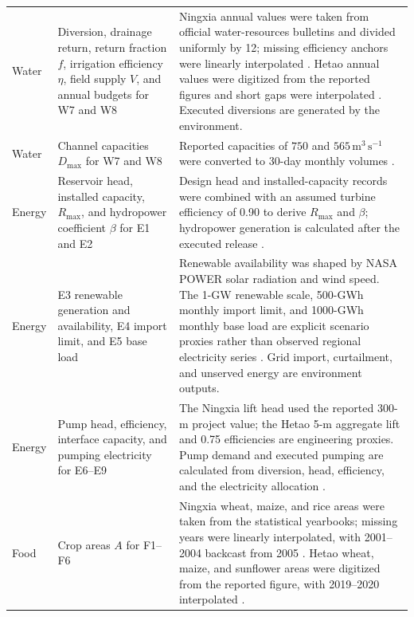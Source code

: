 \documentclass [a4paper,fleqn] {cas-dc}
\begin{document}
\begin{xltabular}{\textwidth}{@{}>{\raggedright\arraybackslash}p{0.09\textwidth}
  >{\raggedright\arraybackslash}p{0.24\textwidth}
  >{\raggedright\arraybackslash}X@{}}
Water & Diversion, drainage return, return fraction $f$, irrigation efficiency
$\eta$, field supply $V$, and annual budgets for W7 and W8 & Ningxia annual
values were taken from official water-resources bulletins and divided uniformly
by 12; missing efficiency anchors were linearly interpolated
\citep{NingxiaWaterBulletins,Meng2015NingxiaIrrigation}. Hetao annual values were
digitized from the reported figures and short gaps were interpolated
\citep{Feng2025Hetao}. Executed diversions are generated by the environment. \\

Water & Channel capacities $D_{\max}$ for W7 and W8 & Reported capacities of
$750$ and $565\,\mathrm{m^3\,s^{-1}}$ were converted to 30-day monthly volumes
\citep{NingxiaCanals2017,Liao2022CanalScheduling}. \\

Energy & Reservoir head, installed capacity, $R_{\max}$, and hydropower
coefficient $\beta$ for E1 and E2 & Design head and installed-capacity records
were combined with an assumed turbine efficiency of 0.90 to derive $R_{\max}$
and $\beta$; hydropower generation is calculated after the executed release
\citep{LongyangxiaNEA2018,Zhang2021Longyangxia,Yin2021YellowRiver}. \\

Energy & E3 renewable generation and availability, E4 import limit, and E5
base load & Renewable availability was shaped by NASA POWER solar radiation and
wind speed. The 1-GW renewable scale, 500-GWh monthly import limit, and
1000-GWh monthly base load are explicit scenario proxies rather than observed
regional electricity series \citep{NASAPOWER}. Grid import, curtailment, and
unserved energy are environment outputs. \\

Energy & Pump head, efficiency, interface capacity, and pumping electricity for
E6--E9 & The Ningxia lift head used the reported 300-m project value; the Hetao
5-m aggregate lift and 0.75 efficiencies are engineering proxies. Pump demand
and executed pumping are calculated from diversion, head, efficiency, and the
electricity allocation \citep{Hongsibu2025Pumping,Liao2022CanalScheduling}. \\

Food & Crop areas $A$ for F1--F6 & Ningxia wheat, maize, and rice areas were
taken from the statistical yearbooks; missing years were linearly interpolated,
with 2001--2004 backcast from 2005 \citep{NingxiaStatisticalYearbooks}. Hetao
wheat, maize, and sunflower areas were digitized from the reported figure, with
2019--2020 interpolated \citep{Feng2025Hetao}. \\


\end{xltabular}
\end{document}
